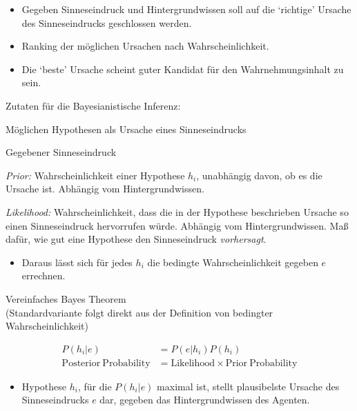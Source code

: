 \documentclass[12pt, handout]{beamer}
\begin{document}
\begin{frame}
  \begin{itemize}[<+->]
  \item Gegeben Sinneseindruck und Hintergrundwissen soll auf die
    `richtige' Ursache des Sinneseindrucks geschlossen werden.
  \item Ranking der möglichen Ursachen nach Wahrscheinlichkeit.
  \item Die `beste' Ursache scheint guter Kandidat für den
    Wahrnehmungsinhalt zu sein.
  \end{itemize}

\end{frame}

\begin{frame} 
  Zutaten für die Bayesianistische Inferenz:

  \begin{description}[xxxxxxxxx]
  \item[$h_1,...,h_n$] Möglichen Hypothesen als Ursache eines
    Sinneseindrucks
  \item[$e$] Gegebener Sinneseindruck
  \item[$P(h_i)$] \emph{Prior:} Wahrscheinlichkeit einer Hypothese
    $h_i$, unabhängig davon, ob es die Ursache ist. Abhängig vom
    Hintergrundwissen.
  \item[$P(e|h_i)$] \emph{Likelihood:} Wahrscheinlichkeit, dass die in
    der Hypothese beschrieben Ursache so einen Sinneseindruck
    hervorrufen würde. Abhängig vom Hintergrundwissen. Maß dafür, wie
    gut eine Hypothese den Sinneseindruck \emph{vorhersagt}.
  \end{description}

  \begin{itemize}[<+->]
  \item Daraus lässt sich für jedes $h_i$ die bedingte
    Wahrscheinlichkeit gegeben $e$ errechnen.
  \end{itemize}

\end{frame}

\begin{frame}

  Vereinfaches Bayes Theorem \\{\scriptsize (Standardvariante folgt
    direkt aus der Definition von bedingter Wahrscheinlichkeit)}

  \begin{align*}
    P(h_i|e) &= P(e|h_i)P(h_i) \\
    \mathrm{Posterior \: Probability} &= \mathrm{Likelihood} \times  \mathrm{Prior \: Probability}
  \end{align*}

  \begin{itemize}[<+->]
  \item Hypothese $h_i$, für die $P(h_i|e)$ maximal ist, stellt
    plausibelste Ursache des Sinneseindrucks $e$ dar, gegeben das
    Hintergrundwissen des Agenten.
  \end{itemize}

\end{frame}
\end{document}
